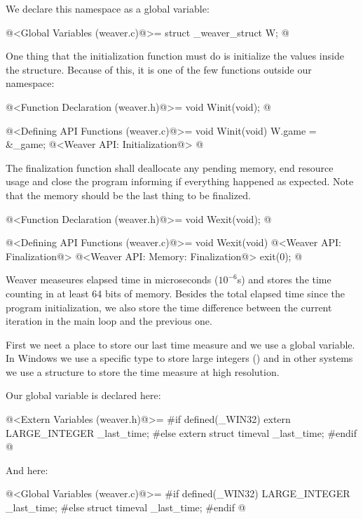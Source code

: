 We declare this namespace as a global variable:

\iniciocodigo
@<Global Variables (weaver.c)@>=
struct _weaver_struct W;
@
\fimcodigo


One thing that the initialization function must do is initialize the
values inside the  structure. Because of this, it is one
of the few functions outside our namespace:

\iniciocodigo
@<Function Declaration (weaver.h)@>=
void Winit(void);
@
\fimcodigo

\iniciocodigo
@<Defining API Functions (weaver.c)@>=
void Winit(void){
  W.game = &_game;
  @<Weaver API: Initialization@>
}
@
\fimcodigo

The finalization function shall deallocate any pending memory, end
resource usage and close the program informing if everything happened
as expected. Note that the memory should be the last thing to be
finalized.

\iniciocodigo
@<Function Declaration (weaver.h)@>=
void Wexit(void);
@
\fimcodigo

\iniciocodigo
@<Defining API Functions (weaver.c)@>=
void Wexit(void){
  @<Weaver API: Finalization@>
  @<Weaver API: Memory: Finalization@>
  exit(0);
}
@
\fimcodigo



Weaver measeures elapsed time in microseconds ($10^{-6}$s) and stores
the time counting in at least 64 bits of memory. Besides the total
elapsed time since the program initialization, we also store the time
difference between the current iteration in the main loop and the
previous one.

First we neet a place to store our last time measure and we use a
global variable. In Windows we use a specific type to store large
integers () and in other systems we use a
 structure to store the time measure at high
resolution.

Our global variable is declared here:

\iniciocodigo
@<Extern Variables (weaver.h)@>=
#if defined(_WIN32)
extern LARGE_INTEGER _last_time;
#else
extern struct timeval _last_time;
#endif
@
\fimcodigo

And here:

\iniciocodigo
@<Global Variables (weaver.c)@>=
#if defined(_WIN32)
LARGE_INTEGER _last_time;
#else
struct timeval _last_time;
#endif
@
\fimcodigo

